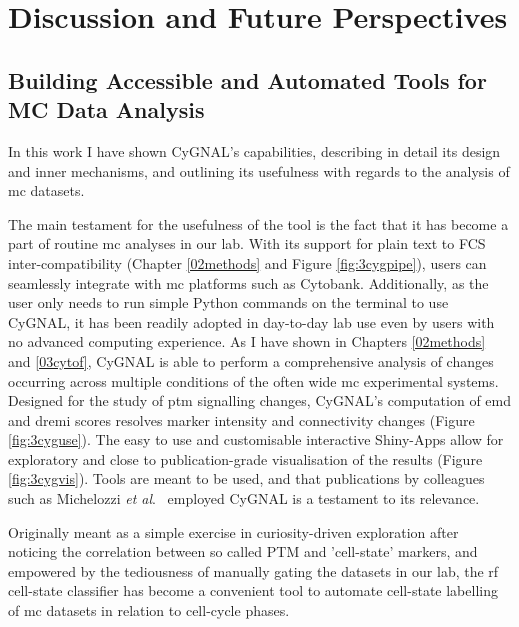 \chapter{Discussion and Future Perspectives}
\label{07disc}

\section{Building Accessible and Automated Tools for MC Data Analysis}

In this work I have shown CyGNAL's capabilities, describing in detail its design and inner mechanisms, and outlining its usefulness with regards to the analysis of \acrshort{mc} datasets.

The main testament for the usefulness of the tool is the fact that it has become a part of routine \acrshort{mc} analyses in our lab. With its support for plain text to FCS inter-compatibility (Chapter \ref{02methods} and Figure \ref{fig:3cygpipe}), users can seamlessly integrate with \acrshort{mc} platforms such as Cytobank. Additionally, as the user only needs to run simple Python commands on the terminal to use CyGNAL, it has been readily adopted in day-to-day lab use even by users with no advanced computing experience. 
As I have shown in Chapters \ref{02methods} and \ref{03cytof}, CyGNAL is able to perform a comprehensive analysis of changes occurring across multiple conditions of the often wide \acrshort{mc} experimental systems. Designed for the study of \acrshort{ptm} signalling changes, CyGNAL's computation of \acrshort{emd} and \acrshort{dremi} scores resolves marker intensity and connectivity changes (Figure \ref{fig:3cyguse}). The easy to use and customisable interactive Shiny-Apps allow for exploratory and close to publication-grade visualisation of the results (Figure \ref{fig:3cygvis}). Tools are meant to be used, and that publications by colleagues such as Michelozzi \emph{et al}.~\cite{michelozzi_activation_2023} employed CyGNAL is a testament to its relevance.

Originally meant as a simple exercise in curiosity-driven exploration after noticing the correlation between so called PTM and 'cell-state' markers, and empowered by the tediousness of manually gating the datasets in our lab, the \acrshort{rf} cell-state classifier has become a convenient tool to automate cell-state labelling of \acrshort{mc} datasets in relation to cell-cycle phases.

